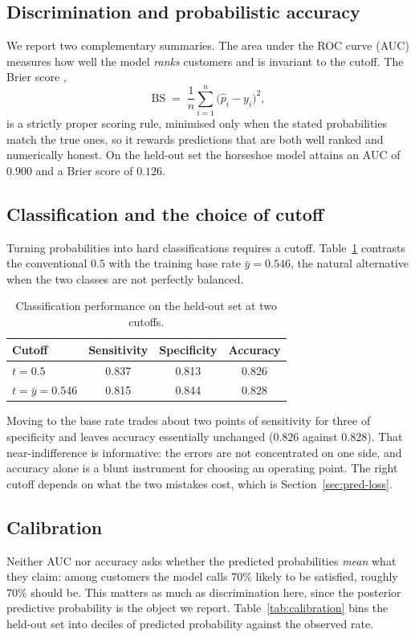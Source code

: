 \subsection{Discrimination and probabilistic accuracy}
We report two complementary summaries. The area under the ROC curve (AUC)
measures how well the model \emph{ranks} customers and is invariant to the
cutoff. The Brier score \cite{bl_book},
\begin{equation}
  \mathrm{BS} \;=\; \frac{1}{n}\sum_{i=1}^{n}\bigl(\hat{p}_i - y_i\bigr)^2 ,
  \label{eq:brier}
\end{equation}
is a strictly proper scoring rule, minimised only when the stated
probabilities match the true ones, so it rewards predictions that are both
well ranked and numerically honest. On the held-out set the horseshoe model
attains an AUC of $0.900$ and a Brier score of $0.126$.

\subsection{Classification and the choice of cutoff}
Turning probabilities into hard classifications requires a cutoff.
Table~\ref{tab:pred-cutoff} contrasts the conventional $0.5$ with the training
base rate $\bar{y} = 0.546$, the natural alternative when the two classes are
not perfectly balanced.

\begin{table}[htbp]
\centering
\small
\caption{Classification performance on the held-out set at two cutoffs.}
\label{tab:pred-cutoff}
\setlength{\tabcolsep}{4pt}
\begin{tabular}{lccc}
\toprule
Cutoff & Sensitivity & Specificity & Accuracy \\
\midrule
$t = 0.5$              & 0.837 & 0.813 & 0.826 \\
$t = \bar{y} = 0.546$  & 0.815 & 0.844 & 0.828 \\
\bottomrule
\end{tabular}
\end{table}

Moving to the base rate trades about two points of sensitivity for three of
specificity and leaves accuracy essentially unchanged ($0.826$ against
$0.828$). That near-indifference is informative: the errors are not
concentrated on one side, and accuracy alone is a blunt instrument for
choosing an operating point. The right cutoff depends on what the two mistakes
cost, which is Section~\ref{sec:pred-loss}.

\subsection{Calibration}
Neither AUC nor accuracy asks whether the predicted probabilities \emph{mean}
what they claim: among customers the model calls $70\%$ likely to be satisfied,
roughly $70\%$ should be. This matters as much as discrimination here, since
the posterior predictive probability is the object we report.
Table~\ref{tab:calibration} bins the held-out set into deciles of predicted
probability against the observed rate.


